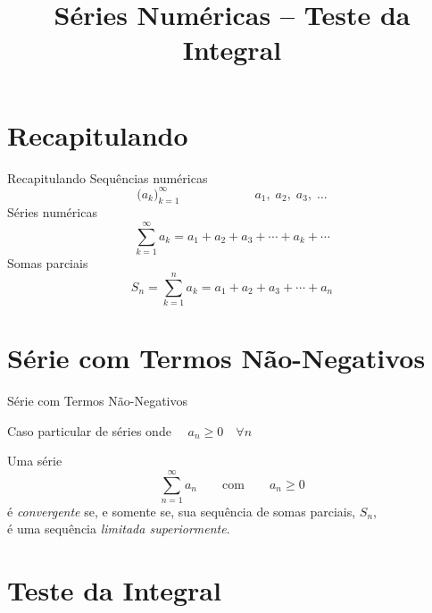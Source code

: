
\usepackage{integracao_e_series}

\title{Séries Numéricas -- Teste da Integral}



\addtitle

\section{Recapitulando}

\begin{frame}{Recapitulando}
  Sequências numéricas
  \[
    \big( a_k \big)_{k=1}^\infty \qquad\qquad\qquad a_1,\; a_2,\; a_3,\; \dots
  \]
  \pause
  Séries numéricas
  \[
    \sum_{k=1}^\infty a_k = a_1 + a_2 + a_3 + \cdots + a_k + \cdots
  \]
  \pause
  Somas parciais
  \[
    S_n = \sum_{k=1}^n a_k = a_1 + a_2 + a_3 + \cdots + a_n
  \]
\end{frame}

\section{Série com Termos Não-Negativos}

\begin{frame}{Série com Termos Não-Negativos}

Caso particular de séries onde $\quad a_n \geq 0 \quad \forall n$

\pause
\vspace{\baselineskip}
Uma série
\[\sum_{n=1}^\infty a_n \qquad \text{com} \qquad a_n\geq 0 \]
é \emph{convergente} se, e somente se, sua sequência de somas parciais, $S_n$, \\
é uma sequência \emph{limitada superiormente}.
\end{frame}

\section{Teste da Integral}

